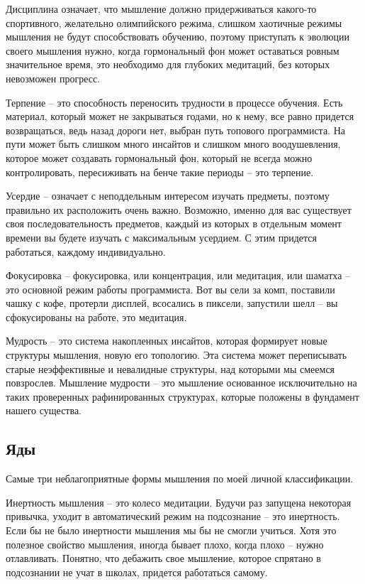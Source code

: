 Дисциплина означает, что мышление должно придерживаться какого-то спортивного, желательно олимпийского режима, слишком хаотичные режимы мышления не будут способствовать обучению, поэтому приступать к эволюции своего мышления нужно, когда гормональный фон может оставаться ровным значительное время, это необходимо для глубоких медитаций, без которых невозможен прогресс.

Терпение – это способность переносить трудности в процессе обучения. Есть материал, который может не закрываться годами, но к нему, все равно придется возвращаться, ведь назад дороги нет, выбран путь топового программиста. На пути может быть слишком много инсайтов и слишком много воодушевления, которое может создавать гормональный фон, который не всегда можно контролировать, пересиживать на бенче такие периоды – это терпение.

Усердие – означает с неподдельным интересом изучать предметы, поэтому правильно их расположить очень важно. Возможно, именно для вас существует своя последовательность предметов, каждый из которых в отдельным момент времени вы будете изучать с максимальным усердием. С этим придется работаться, каждому индивидуально.

Фокусировка – фокусировка, или концентрация, или медитация, или шаматха – это основной режим работы программиста. Вот вы сели за комп, поставили чашку с кофе, протерли дисплей, всосались в пиксели, запустили шелл – вы сфокусированы на работе, это медитация.

Мудрость – это система накопленных инсайтов, которая формирует новые структуры мышления, новую его топологию. Эта система может переписывать старые неэффективные и невалидные структуры, над которыми мы смеемся повзрослев. Мышление мудрости – это мышление основанное исключительно на таких проверенных рафинированных структурах, которые положены в фундамент нашего существа.

\subsection{Яды}

Самые три неблагоприятные формы мышления по моей личной классификации.

Инертность мышления – это колесо медитации. Будучи раз запущена некоторая привычка, уходит в автоматический режим на подсознание – это инертность. Если бы не было инертности мышления мы бы не смогли учиться. Хотя это полезное свойство мышления, иногда бывает плохо, когда плохо – нужно отлавливать. Понятно, что дебажить свое мышление, которое спрятано в подсознании не учат в школах, придется работаться самому.

